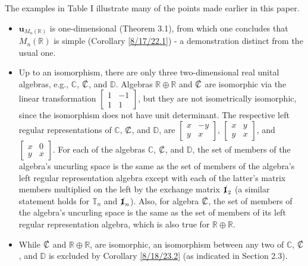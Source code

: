 \documentclass{amsart}
\numberwithin{equation}{section}
\theoremstyle{definition}
\numberwithin{theorem}{section}
\begin{document}
\bigskip

The examples in Table I illustrate many of the points made earlier in this paper.    
 
\begin{itemize}\item $\mathbf{u}_{M_n(\mathbb{R})}$ is one-dimensional (Theorem 3.1), from which one concludes that $M_n(\mathbb{R})$ is simple (Corollary \ref{8/17/22.1}) - a demonstration distinct from the usual one.
\item Up to an isomorphism, there are only three two-dimensional real unital algebras, e.g., $\mathbb{C}$, $\slashed{\mathbb{C}}$, and $\mathbb{D}$.  Algebras $\mathbb{R}\oplus\mathbb{R}$ and $\slashed{\mathbb{C}}$ are isomorphic via the linear transformation $\left[\begin{array}{ccc}
 1 & -1   \\ 
 1 & 1    
\end{array}\right]$, but they are not isometrically isomorphic, since the isomorphism does not have unit determinant.  The respective left regular representations of $\mathbb{C}$, $\slashed{\mathbb{C}}$, and $\mathbb{D}$, are $\left[\begin{array}{ccc}
 x & -y   \\ 
 y & x    
\end{array}\right]$, $\left[\begin{array}{ccc}
 x & y   \\ 
 y & x    
\end{array}\right]$, and $\left[\begin{array}{ccc}
 x & 0   \\ 
 y & x    
\end{array}\right]$.  For each of the algebras $\mathbb{C}$, $\slashed{\mathbb{C}}$, and $\mathbb{D}$, the set of members of the algebra's uncurling space is the same as the set of members of the algebra's left regular representation algebra except with each of the latter's matrix members multiplied on the left by the exchange matrix $\slashed{\mathbf{1}}_2$ (a similar statement holds for $\mathbb{T}_n$ and $\slashed{\mathbf{1}}_n$).  Also, for algebra $\slashed{\mathbb{C}}$, the set of members of the algebra's uncurling space is the same as the set of members of its left regular representation algebra, which is also true for $\mathbb{R}\oplus\mathbb{R}$. \item While $\slashed{\mathbb{C}}$ and $\mathbb{R}\oplus\mathbb{R}$, are isomorphic, an isomorphism between any two of $\mathbb{C}$, $\slashed{\mathbb{C}}$, and $\mathbb{D}$ is excluded by Corollary \ref{8/18/23.2} (as indicated in Section 2.3).  

\end{itemize}
\end{document}
